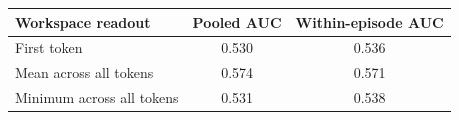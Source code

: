 \begin{tabular}{lcc}
\toprule
Workspace readout & Pooled AUC & Within-episode AUC \\
\midrule
First token & 0.530 & 0.536 \\
Mean across all tokens & 0.574 & 0.571 \\
Minimum across all tokens & 0.531 & 0.538 \\
\bottomrule
\end{tabular}
